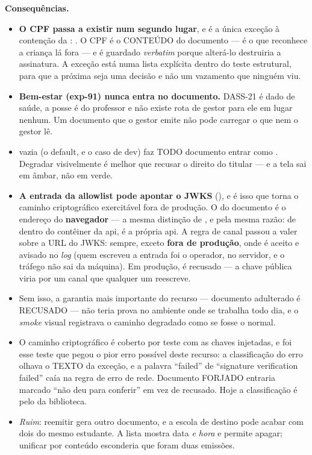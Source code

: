 \textbf{Consequências.}
\begin{itemize}
  \item \textbf{O CPF passa a existir num segundo lugar}, e é a única exceção à
    contenção da : . O CPF é o
    CONTEÚDO do documento --- é o que reconhece a criança lá fora --- e é
    guardado \emph{verbatim} porque alterá-lo destruiria a assinatura. A exceção
    está numa lista explícita dentro do teste estrutural, para que a próxima seja
    uma decisão e não um vazamento que ninguém viu.
  \item \textbf{Bem-estar (exp-91) nunca entra no documento.} DASS-21 é dado de
    saúde, a posse é do professor e não existe rota de gestor para ele em lugar
    nenhum. Um documento que o gestor emite não pode carregar o que nem o gestor
    lê.
  \item {} vazia (o default, e o caso de dev) faz
    TODO documento entrar como . Degradar visivelmente é
    melhor que recusar o direito do titular --- e a tela sai em âmbar, não em
    verde.
  \item \textbf{A entrada da allowlist pode apontar o JWKS}
    (), e é isso que torna o caminho criptográfico
    exercitável fora de produção. O  do documento é o endereço do
    \textbf{navegador} --- a mesma distinção de , e pela
    mesma razão: de dentro do contêiner da api,  é a própria
    api. A regra de canal passou a valer sobre a URL do JWKS:  sempre,
    exceto \textbf{fora de produção}, onde  é aceito e avisado no
    \emph{log} (quem escreveu a entrada foi o operador, no servidor, e o tráfego
    não sai da máquina). Em produção,  é recusado --- a chave pública
    viria por um canal que qualquer um reescreve.
  \item Sem isso, a garantia mais importante do recurso --- documento adulterado
    é RECUSADO --- não teria prova no ambiente onde se trabalha todo dia, e o
    \emph{smoke} visual registrava o caminho degradado como se fosse o normal.
  \item O caminho criptográfico é coberto por teste com as chaves injetadas, e
    foi esse teste que pegou o pior erro possível deste recurso: a classificação
    do erro olhava o TEXTO da exceção, e a palavra \enquote{failed} de
    \enquote{signature verification failed} caía na regra de erro de rede.
    Documento FORJADO entraria marcado \enquote{não deu para conferir} em vez de
    recusado. Hoje a classificação é pelo  da biblioteca.
  \item \emph{Ruim}: reemitir gera outro documento, e a escola de destino pode
    acabar com dois do mesmo estudante. A lista mostra data \emph{e hora} e permite
    apagar; unificar por conteúdo esconderia que foram duas emissões.
\end{itemize}

